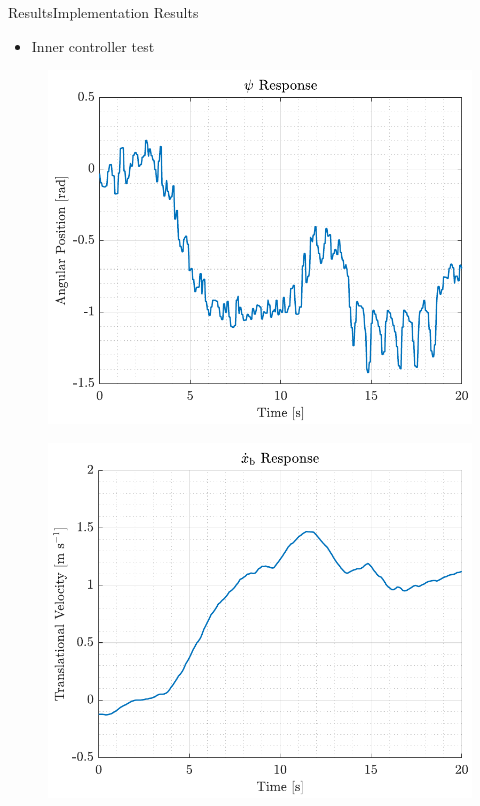 \begin{frame}{Results}{Implementation Results}
    \begin{itemize}
        \item Inner controller test
    \end{itemize}
    \begin{minipage}{0.45\linewidth}
        \begin{figure}[H]
            \centering
            \includegraphics[width=1\linewidth]{figures/inner_yaw}
        \end{figure}       
    \end{minipage}\hfill      
    \begin{minipage}{0.45\linewidth}
        \begin{figure}[H]
            \centering
            \includegraphics[width=1\linewidth]{figures/inner_xbdot}
        \end{figure}             
    \end{minipage}\hfill \\    
\end{frame}

